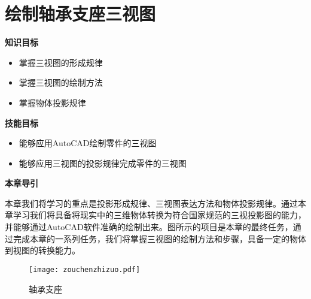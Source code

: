 \chapter{绘制轴承支座三视图}
{\bfseries 知识目标}
\begin{itemize}
\item 掌握三视图的形成规律
\item 掌握三视图的绘制方法
\item 掌握物体投影规律
\end{itemize}

{\bfseries 技能目标}
\begin{itemize}
\item 能够应用AutoCAD绘制零件的三视图
\item 能够应用三视图的投影规律完成零件的三视图
\end{itemize}

{\bfseries 本章导引}

本章我们将学习的重点是投影形成规律、三视图表达方法和物体投影规律。通过本章学习我们将具备将现实中的三维物体转换为符合国家规范的三视投影图的能力，并能够通过AutoCAD软件准确的绘制出来。图所示的项目是本章的最终任务，通过完成本章的一系列任务，我们将掌握三视图的绘制方法和步骤，具备一定的物体到视图的转换能力。

\noindent
\begin{figure}[htbp]
\centering
\texttt{[image: zouchenzhizuo.pdf]}
\caption{轴承支座}\label{fig:zouchenzhizuo}
\end{figure}

\endinput